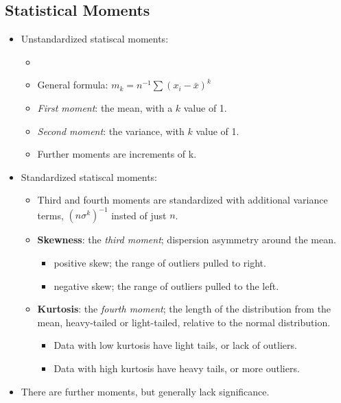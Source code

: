 \documentclass[12pt,a4paper]{article}
\begin{document}
\subsection{Statistical Moments}
\begin{itemize}
    \item Unstandardized statiscal moments:
        \begin{itemize}
            \item 
            \item General formula: {\color{o-Sun}\(m_k = n^{-1}\sum(x_i-\bar{x})^k\)}
            \item \textit{First moment}: the {\color{o-Sun}mean}, with a \(k\) value of 1.
            \item \textit{Second moment}: the {\color{o-Sun}variance}, with \(k\) value of 1.
            \item Further moments are increments of k.
        \end{itemize}
    \item Standardized statiscal moments:
        \begin{itemize}
            \item Third and fourth moments are standardized with additional variance terms, {\color{o-Sun}\((n\sigma^k)^{-1}\)} insted of just \(n\).
            \item \textbf{Skewness}: the \textit{third moment}; dispersion asymmetry around the mean.
                \begin{itemize}
                    \item {\color{pos}positive skew}; the range of outliers pulled to right.
                    \item {\color{neg}negative skew}; the range of outliers pulled to the left. 
                \end{itemize}
            \item \textbf{Kurtosis}: the \textit{fourth moment}; the length of the distribution from the mean, heavy-tailed or light-tailed, relative to the normal distribution.
                \begin{itemize}
                    \item Data with {\color{o-Sun}low} kurtosis have light tails, or {\color{o-Sun}lack of outliers}.
                    \item Data with {\color{o-Sun}high} kurtosis have heavy tails, or {\color{o-Sun}more outliers}.
                \end{itemize}
        \end{itemize}
    \item There are further moments, but generally lack significance.
\end{itemize}
\end{document}
